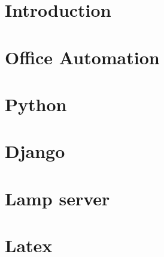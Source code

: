 \documentclass[12pt]{article}
\begin{document}
\begin{screen}
\ppttitle
\end{screen}
\begin{screen}
\footskip 1.5cm
\thispagestyle{empty} 
\pagetitle
{}
\rfoot{\thepage}  






\end{screen}
\newpage
\section{Introduction}

\newpage
\section{Office Automation}



\newpage
\section{Python}


\newpage
\section{Django}


\newpage
\section{Lamp server}




\newpage
\section{Latex}


\newpage


\newpage


\newpage
\end{document}
